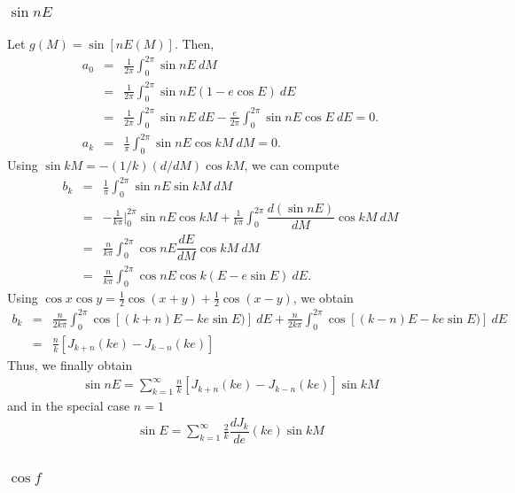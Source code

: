 \documentclass [12pt, a4paper] {article}
\newcommand{\diff}[2]
{
	\dfrac{d #1}{d #2}
}
\begin{document}
\subsubsection{$\sin nE$}
Let $g(M) = \sin[n E(M)]$. Then, 
\begin {eqnarray}
    a_0 
    &=&
    \frac{1}{2\pi}\int_0^{2\pi}
    \sin nE\: dM 
    \\
    &=&
    \frac{1}{2\pi}\int_0^{2\pi}
    \sin nE(1 - e\cos E)\:dE
    \\
    &=&
    \frac{1}{2\pi}\int_0^{2\pi}
    \sin nE\:dE
    -
    \frac{e}{2\pi}\int_0^{2\pi}
    \sin nE\cos E\:dE
    =
    0.
    \\
    a_k 
    &=&
    \frac{1}{\pi}\int_0^{2\pi}
    \sin nE\cos kM\: dM
    = 0. 
\end {eqnarray}
Using $\sin kM = -(1/k) (d/dM)\cos kM$, we can compute 
\begin {eqnarray}
    b_k 
    &=& 
    \frac{1}{\pi}\int_0^{2\pi}
    \sin nE\sin kM\:dM
    \\
    &=& 
    -\frac{1}{k\pi}\Big |_0^{2\pi}
    \sin nE\cos kM
    +
    \frac{1}{k\pi}\int_0^{2\pi}
    \diff{(\sin nE)}{M}\cos kM\: dM
    \\
    &=& 
    \frac{n}{k\pi}\int_0^{2\pi}
    \cos nE\diff{E}{M}\cos kM\: dM
    \\
    &=& 
    \frac{n}{k\pi}\int_0^{2\pi}
    \cos nE\cos k(E - e\sin E)\: dE.
\end {eqnarray}
Using $\cos x\cos y = \frac{1}{2}\cos(x + y) + \frac{1}{2}\cos(x - y)$, we obtain 
\begin {eqnarray}
    b_k 
    &=&
    \frac{n}{2k\pi}\int_0^{2\pi}
    \cos [(k+n)E - ke\sin E)]\: dE
    +
    \frac{n}{2k\pi}\int_0^{2\pi}
    \cos [(k-n)E - ke\sin E)]\: dE
    \\
    &=& 
    \frac{n}{k}
    \left[
        J_{k+n}(ke) - J_{k-n}(ke)
    \right]
\end {eqnarray}
Thus, we finally obtain
\begin {eqnarray}
    \sin nE
    =
    \sum_{k=1}^\infty
    \frac{n}{k}
    \left[
        J_{k+n}(ke) - J_{k-n}(ke)
    \right]\sin kM
\end {eqnarray}
and in the special case $n=1$ 
\begin {eqnarray}
    \sin E
    =
    \sum_{k=1}^\infty
    \frac{2}{k}
    \diff{J_k}{e}(ke)
    \sin kM
\end {eqnarray}

\subsubsection{$\cos f$}
\end{document}
